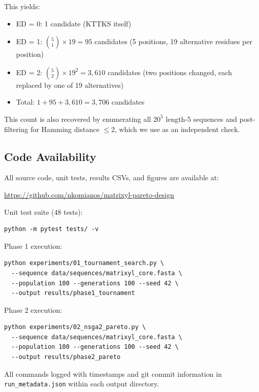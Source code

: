 \documentclass[11pt,letterpaper]{article}
\begin{document}
This yields:
\begin{itemize}
  \item ED = 0: 1 candidate (KTTKS itself)
  \item ED = 1: ${5 \choose 1} \times 19 = 95$ candidates (5 positions, 19 alternative residues per position)
  \item ED = 2: ${5 \choose 2} \times 19^2 = 3{,}610$ candidates (two positions changed, each replaced by one of 19 alternatives)
  \item Total: $1 + 95 + 3{,}610 = 3{,}706$ candidates
\end{itemize}

This count is also recovered by enumerating all $20^5$ length-5 sequences and post-filtering for Hamming distance $\leq 2$, which we use as an independent check.

\subsection{Code Availability}

All source code, unit tests, results CSVs, and figures are available at:
\begin{center}
\url{https://github.com/nkomianos/matrixyl-pareto-design}
\end{center}

Unit test suite (48 tests):
\begin{verbatim}
python -m pytest tests/ -v
\end{verbatim}

Phase 1 execution:
\begin{verbatim}
python experiments/01_tournament_search.py \
  --sequence data/sequences/matrixyl_core.fasta \
  --population 100 --generations 100 --seed 42 \
  --output results/phase1_tournament
\end{verbatim}

Phase 2 execution:
\begin{verbatim}
python experiments/02_nsga2_pareto.py \
  --sequence data/sequences/matrixyl_core.fasta \
  --population 100 --generations 100 --seed 42 \
  --output results/phase2_pareto
\end{verbatim}

All commands logged with timestamps and git commit information in \texttt{run\_metadata.json} within each output directory.
\end{document}
